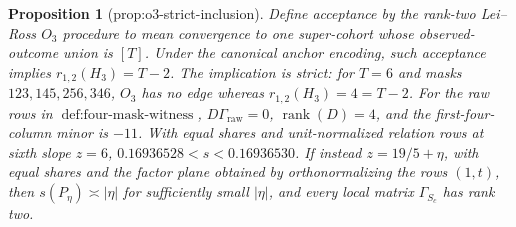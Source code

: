 \documentclass{article}
\newtheorem{proposition}{Proposition}
\begin{document}
\begin{proposition}[prop:o3-strict-inclusion]\label{prop:o3-strict-inclusion}
Define acceptance by the rank-two Lei--Ross \(O_3\) procedure to mean convergence to one super-cohort whose observed-outcome union is \([T]\). Under the canonical anchor encoding, such acceptance implies \(r_{1,2}(H_3)=T-2\). The implication is strict: for \(T=6\) and masks \(123,145,256,346\), \(O_3\) has no edge whereas \(r_{1,2}(H_3)=4=T-2\). For the raw rows in \(\operatorname{def:four-mask-witness}\), \(D\Gamma_{\mathrm{raw}}=0\), \(\operatorname{rank}(D)=4\), and the first-four-column minor is \(-11\). With equal shares and unit-normalized relation rows at sixth slope \(z=6\), \(0.16936528<s<0.16936530\). If instead \(z=19/5+\eta\), with equal shares and the factor plane obtained by orthonormalizing the rows \((1,t)\), then \(s(P_\eta)\asymp|\eta|\) for sufficiently small \(|\eta|\), and every local matrix \(\Gamma_{S_c}\) has rank two.
\end{proposition}
\end{document}
